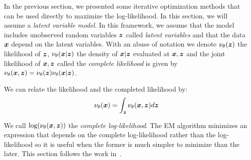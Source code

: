 In the previous section, we presented some iterative
optimization methods that can be used directly to maximize the log-likelihood.
In this section, we will assume a \emph{latent variable model}. In this
framework, we assume that the model includes unobserved random variables $\boldsymbol{z}$
called \emph{latent variables} and that the data $\boldsymbol{x}$ depend on
the latent variables. With an abuse of notation we denote $\nu_{\theta}(\boldsymbol{z})$
the likelihood of $\boldsymbol{z}$, $\nu_{\theta}(\boldsymbol{x} | \boldsymbol{z})$ the density of $\boldsymbol{x} | \boldsymbol{z}$
evaluated at $\boldsymbol{x}, \boldsymbol{z}$ and the joint likelihood of $\boldsymbol{x}, \boldsymbol{z}$ called the
\emph{complete likelihood} is given by $\nu_{\theta}(\boldsymbol{x}, \boldsymbol{z}) =
\nu_{\theta}(\boldsymbol{z}) \nu_{\theta}(\boldsymbol{x} | \boldsymbol{z})$.  

We can relate the likelihood and the completed likelihood by:
\begin{align}
  \nu_{\theta}(\boldsymbol{x}) = \int_{\boldsymbol{z}} \nu_{\theta}(\boldsymbol{x}, \boldsymbol{z}) d\boldsymbol{z}
\end{align}

We call $\log(\nu_{\theta}(\boldsymbol{x}, \boldsymbol{z}))$ the \emph{complete log-likelihood}.
The EM algorithm minimizes an expression
that depends on the complete log-likelihood rather than the log-likelihood so it
is useful when the former is much simpler to minimize than the later.
This section follows the work in~\cite{neal1998view}.


